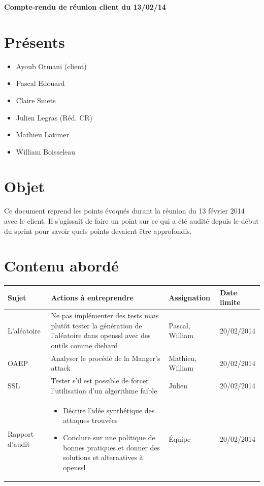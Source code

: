 \documentclass[a4paper,11pt,french]{article}
\author{\hmwkAuthorName}
\date{} %
\newcommand{\hmwkDocName}{Compte-rendu de réunion client du 13/02/14} %
\begin{document}
\pagestyle{fancy}

\begin{center}\textbf{\Huge{\hmwkDocName}}\end{center}
	
\section{Présents}
\begin{itemize}
\item Ayoub Otmani (client)
\item Pascal Edouard 
\item Claire Smets
\item Julien Legras (Réd. CR) 
\item Mathieu Latimer
\item William Boisseleau
\end{itemize}

\section{Objet}
Ce document reprend les points évoqués durant la réunion du 13 février 2014 avec le client. Il s'agissait de faire un point sur ce qui a été audité depuis le début du sprint pour savoir quels points devaient être approfondis.

\section{Contenu abordé}
\begin{center}

\begin{tabular}{ | l | p{10cm} | p{2cm} | l |}
	\hline
   \textbf{Sujet} & \textbf{Actions à entreprendre} & \textbf{Assignation} & \textbf{Date limite}  \\ \hline
L'aléatoire & Ne pas implémenter des tests mais plutôt tester la génération de l'aléatoire dans openssl avec des outils comme diehard & Pascal, William & 20/02/2014\\ \hline
OAEP & Analyser le procédé de la Manger's attack & Mathieu, William & 20/02/2014\\ \hline
SSL & Tester s'il est possible de forcer l'utilisation d'un algorithme faible & Julien & 20/02/2014\\ \hline
Rapport d'audit& \begin{itemize}\item Décrire l'idée synthétique des attaques trouvées \item Conclure sur une politique de bonnes pratiques et donner des solutions et alternatives à openssl\end{itemize} & Équipe & 20/02/2014\\
 \hline
 \end{tabular}
 
\end{center}
\end{document}
